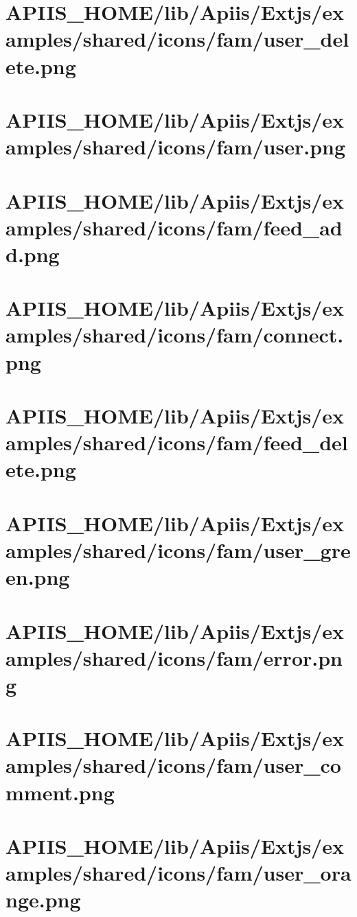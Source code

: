 \section{APIIS\_HOME/lib/Apiis/Extjs/examples/shared/icons/fam/user\_delete.png} 
\section{APIIS\_HOME/lib/Apiis/Extjs/examples/shared/icons/fam/user.png} 
\section{APIIS\_HOME/lib/Apiis/Extjs/examples/shared/icons/fam/feed\_add.png} 
\section{APIIS\_HOME/lib/Apiis/Extjs/examples/shared/icons/fam/connect.png} 
\section{APIIS\_HOME/lib/Apiis/Extjs/examples/shared/icons/fam/feed\_delete.png} 
\section{APIIS\_HOME/lib/Apiis/Extjs/examples/shared/icons/fam/user\_green.png} 
\section{APIIS\_HOME/lib/Apiis/Extjs/examples/shared/icons/fam/error.png} 
\section{APIIS\_HOME/lib/Apiis/Extjs/examples/shared/icons/fam/user\_comment.png} 
\section{APIIS\_HOME/lib/Apiis/Extjs/examples/shared/icons/fam/user\_orange.png} 
